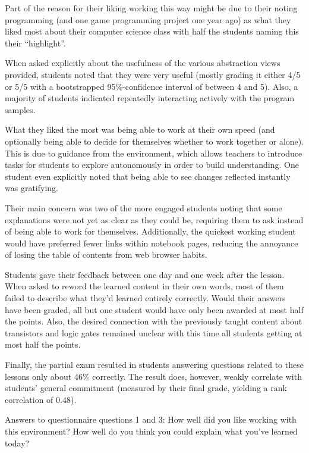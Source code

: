 Part of the reason for their liking working this way might be due to their noting programming (and one game programming project one year ago) as what they liked most about their computer science class with half the students naming this their ``highlight''.

When asked explicitly about the usefulness of the various abstraction views provided, students noted that they were very useful (mostly grading it either 4/5 or 5/5 with a bootstrapped 95\%-confidence interval of between 4 and 5). Also, a majority of students indicated repeatedly interacting actively with the program samples.

What they liked the most was being able to work at their own speed (and optionally being able to decide for themselves whether to work together or alone). This is due to guidance from the environment, which allows teachers to introduce tasks for students to explore autonomously in order to build understanding. One student even explicitly noted that being able to see changes reflected instantly was gratifying.

Their main concern was two of the more engaged students noting that some explanations were not yet as clear as they could be, requiring them to ask instead of being able to work for themselves. Additionally, the quickest working student would have preferred fewer links within notebook pages, reducing the annoyance of losing the table of contents from web browser habits.

Students gave their feedback between one day and one week after the lesson. When asked to reword the learned content in their own words, most of them failed to describe what they'd learned entirely correctly. Would their answers have been graded, all but one student would have only been awarded at most half the points. Also, the desired connection with the previously taught content about transistors and logic gates remained unclear with this time all students getting at most half the points.

Finally, the partial exam resulted in students answering questions related to these lessons only about 46\% correctly. The result does, however, weakly correlate with students' general commitment (measured by their final grade, yielding a rank correlation of $0.48$).

\begin{cfigure}{Answers to questionnaire questions 1 and 3: How well did you like working with this environment? How well do you think you could explain what you've learned today?}

\end{cfigure}



